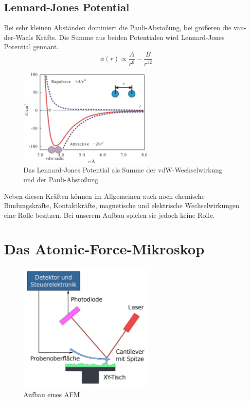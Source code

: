        \subsection{Lennard-Jones Potential}

Bei sehr kleinen Abständen dominiert die Pauli-Abstoßung, bei größeren die 
van-der-Waals Kräfte. Die Summe aus beiden Potentialen wird Lennard-Jones 
Potential gennant. 
\[
   \phi (r) \propto \frac{A}{r^6} - \frac{B}{r^{12}}    
\]

\begin{figure}[hb]
    \centering
    \includegraphics[width=0.6\textwidth]{Abb/ljp.jpg}
    \caption{Das Lennard-Jones Potential als Summe der vdW-Wechselwirkung und
             der Pauli-Abstoßung}
    \label{ljp}
\end{figure}



Neben diesen Kräften können im Allgemeinen auch noch chemische Bindungskräfte, Kontaktkräfte, magnetische und elektrische Wechselwirkungen eine Rolle besitzen.
Bei unserem Aufbau spielen sie jedoch keine Rolle.



 \section{Das Atomic-Force-Mikroskop}
 
\begin{figure}[h]
    \centering
    \includegraphics[width=0.6\textwidth]{Abb/afm.jpg}
    \caption{Aufbau eines AFM}
    \label{afm}
\end{figure}
 
